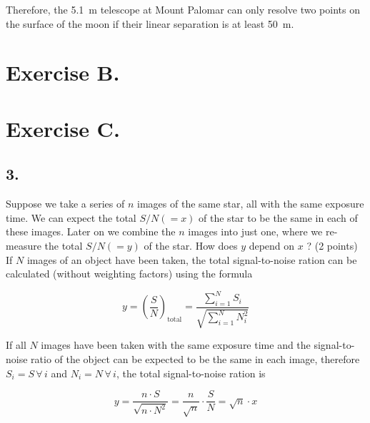 \documentclass[11pt,a4paper,twoside]{article}
\begin{document}
Therefore, the \SI{5.1}{\meter} telescope at Mount Palomar can only resolve two points on the surface of the moon if their linear separation is at least \SI{50}{\meter}.

\section*{Exercise B.} 

\section*{Exercise C.}

\subsection*{3.}  Suppose we take a series of $n$ images of the same star, all with the same exposure time. We can expect the total $S/N (= x)$ of the star to be the same in each of these images. Later on we combine the $n$ images into just one, where we re-measure the total $S/N (= y)$ of the star. How does $y$ depend on $x$ ? (2 points) \\

If $N$ images of an object have been taken, the total signal-to-noise ration can be calculated (without weighting factors) using the formula

\begin{equation}
 y = \left( \frac{S}{N} \right)_{\text{total}} = \frac{\sum_{i=1}^N S_i}{\sqrt{\sum_{i=1}^N N_i^2}}
\end{equation}

If all $N$ images have been taken with the same exposure time and the signal-to-noise ratio of the object can be expected to be the same in each image, therefore $S_i = S \, \forall \, i$ and $N_i = N \, \forall \, i$, the total signal-to-noise ration is 

\begin{equation}
 y = \frac{n \cdot S}{\sqrt{n \cdot N^2}} = \frac{n}{\sqrt{n}} \cdot \frac{S}{N} = \sqrt{n} \cdot x
\end{equation}
\end{document}
